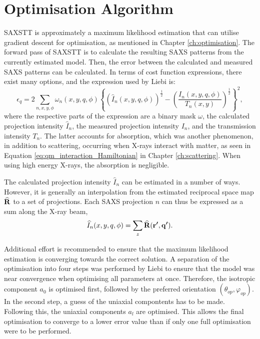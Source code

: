 \section{Optimisation Algorithm}

SAXSTT is approximately a maximum likelihood estimation that can utilise gradient descent for optimisation, as mentioned in Chapter \ref{ch:optimisation}.
The forward pass of SAXSTT is to calculate the resulting SAXS patterns from the currently estimated model.
Then, the error between the calculated and measured SAXS patterns can be calculated.
In terms of cost function expressions, there exist many options, and the expression used by Liebi \cite{liebi2018small} is:
\begin{equation}\label{eq:cost_function_SAXSTT}
    \epsilon_{q} = 2 \sum_{n, x, y, \phi} \omega_{n}(x,y,q,\phi) \left\{ \left( \widehat{I}_{n}(x,y,q,\phi) \right)^{\frac{1}{2}}  -  \left( \frac{ I_{n}(x,y,q,\phi) }{T_{n}(x,y)} \right)^{\frac{1}{2}} \right\}^{2},
\end{equation}
\noindent
where the respective parts of the expression are a binary mask $\omega$, the calculated projection intensity $\widehat{I}_{n}$, the measured projection intensity $I_{n}$, and the transmission intensity $T_{n}$.
The latter accounts for absorption, which was another phenomenon, in addition to scattering, occurring when X-rays interact with matter,
as seen in Equation \eqref{eq:qm_interaction_Hamiltonian} in Chapter \ref{ch:scattering}. When using high energy X-rays, the absorption is negligible.

The calculated projection intensity $\widehat{I}_{n}$ can be estimated in a number of ways.
However, it is generally an interpolation from the estimated reciprocal space map $\bm{\mathrm{\widehat{R}}}$ to a set of projections.
Each SAXS projection $n$ can thus be expressed as a sum along the X-ray beam,
\begin{equation}\label{eq:SAXS_intensity}
    \widehat{I}_{n}(x,y,q,\phi) = \sum_{z} \bm{\widehat{\mathrm{R}}}(\bm{\mathrm{r'}}, \bm{\mathrm{q'}}).
\end{equation}

Additional effort is recommended to ensure that the maximum likelihood estimation is converging towards the correct solution.
A separation of the optimisation into four steps was performed by Liebi \cite{liebi2018small} to ensure that the model was near convergence when optimising all parameters at once.
Therefore, the isotropic component $a_{0}$ is optimised first, followed by the preferred orientation $(\theta_{op}, \varphi_{op})$. In the second step, a guess of the uniaxial compontents has to be made.
Following this, the uniaxial components $a_{l}$ are optimised.
This allows the final optimisation to converge to a lower error value than if only one full optimisation were to be performed.


